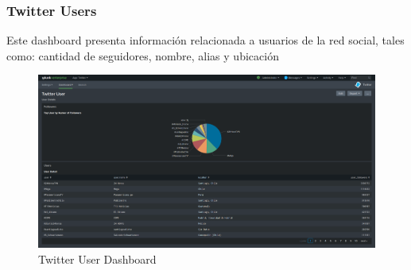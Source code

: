 \documentclass[a4paper]{article}
\begin{document}
\subsubsection*{Twitter Users}

Este dashboard presenta información relacionada a usuarios de la red social, tales como: cantidad de seguidores, nombre, alias y ubicación 
\begin{figure}[h!]
	\centering
	\includegraphics[scale=0.2]{img/user.png}
	\caption{\color{text}Twitter User Dashboard}
\end{figure}


\end{document}
